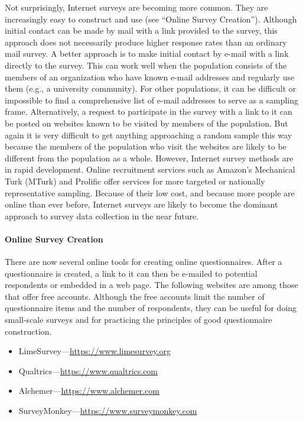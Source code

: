 \documentclass[
]{krantz}
\providecommand{\tightlist}{%
  \setlength{\itemsep}{0pt}\setlength{\parskip}{0pt}}
\begin{document}
Not surprisingly, Internet surveys are becoming more common. They are increasingly easy to construct and use (see ``Online Survey Creation''). Although initial contact can be made by mail with a link provided to the survey, this approach does not necessarily produce higher response rates than an ordinary mail survey. A better approach is to make initial contact by e-mail with a link directly to the survey. This can work well when the population consists of the members of an organization who have known e-mail addresses and regularly use them (e.g., a university community). For other populations, it can be difficult or impossible to find a comprehensive list of e-mail addresses to serve as a sampling frame. Alternatively, a request to participate in the survey with a link to it can be posted on websites known to be visited by members of the population. But again it is very difficult to get anything approaching a random sample this way because the members of the population who visit the websites are likely to be different from the population as a whole. However, Internet survey methods are in rapid development. Online recruitment services such as Amazon's Mechanical Turk (MTurk) and Prolific offer services for more targeted or nationally representative sampling. Because of their low cost, and because more people are online than ever before, Internet surveys are likely to become the dominant approach to survey data collection in the near future.

\paragraph*{Online Survey Creation}\label{online-survey-creation}

There are now several online tools for creating online questionnaires. After a questionnaire is created, a link to it can then be e-mailed to potential respondents or embedded in a web page. The following websites are among those that offer free accounts. Although the free accounts limit the number of questionnaire items and the number of respondents, they can be useful for doing small-scale surveys and for practicing the principles of good questionnaire construction.

\begin{itemize}
\tightlist
\item
  LimeSurvey---\url{https://www.limesurvey.org}
\item
  Qualtrics---\url{https://www.qualtrics.com}
\item
  Alchemer---\url{https://www.alchemer.com}
\item
  SurveyMonkey---\url{https://www.surveymonkey.com}
\end{itemize}
\end{document}
